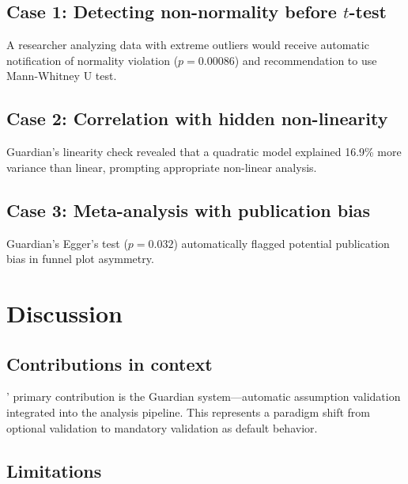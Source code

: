 \documentclass[article]{jss}
\begin{document}
\subsection{Case 1: Detecting non-normality before $t$-test}

A researcher analyzing data with extreme outliers would receive automatic notification of normality violation ($p = 0.00086$) and recommendation to use Mann-Whitney U test.

\subsection{Case 2: Correlation with hidden non-linearity}

Guardian's linearity check revealed that a quadratic model explained 16.9\% more variance than linear, prompting appropriate non-linear analysis.

\subsection{Case 3: Meta-analysis with publication bias}

Guardian's Egger's test ($p = 0.032$) automatically flagged potential publication bias in funnel plot asymmetry.


\section{Discussion} \label{sec:discussion}


\subsection{Contributions in context}

' primary contribution is the Guardian system---automatic assumption validation integrated into the analysis pipeline. This represents a paradigm shift from optional validation to mandatory validation as default behavior.

\subsection{Limitations}
\end{document}
